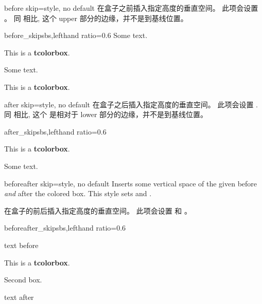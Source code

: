 
\begin{docTcbKey}[][doc new and updated={2020-09-25}{2015-03-16}]{before skip}{=}{style, no default}
在盒子之前插入指定高度的垂直空间。%
此项会设置 。%
同  相比, 这个  upper 部分的边缘，并不是到基线位置。
\begin{exdispExample*}{before_skip}{sbs,lefthand ratio=0.6}
Some text.
\begin{tcolorbox}[before skip=1cm,
colframe=red!50!white]
This is a \textbf{tcolorbox}.
\end{tcolorbox}

Some text.
\begin{tcolorbox}[before skip=0cm,
colframe=red!50!white]
This is a \textbf{tcolorbox}.
\end{tcolorbox}
\end{exdispExample*}
\end{docTcbKey}

\begin{docTcbKey}[][doc new and updated={2020-09-25}{2017-02-01}]{after skip}{=}{style, no default}
在盒子之后插入指定高度的垂直空间。%
此项会设置 .
同  相比, %
这个  是相对于 lower 部分的边缘，并不是到基线位置。%
\begin{exdispExample*}{after_skip}{sbs,lefthand ratio=0.6}
\begin{tcolorbox}[after skip=1cm,
colframe=red!50!white]
This is a \textbf{tcolorbox}.
\end{tcolorbox}
Some text.
\end{exdispExample*}
\end{docTcbKey}

\begin{docTcbKey}[][doc new=2014-10-10]{beforeafter skip}{=}{style, no default}
Inserts some vertical space of the given  before \emph{and} after the colored box.
This style sets  and .

在盒子的前后插入指定高度的垂直空间。%
此项会设置  和 。


\begin{exdispExample*}{beforeafter_skip}{sbs,lefthand ratio=0.6}

text before
\begin{tcolorbox}
This is a \textbf{tcolorbox}.
\end{tcolorbox}
\begin{tcolorbox}
Second box.
\end{tcolorbox}
text after
\end{exdispExample*}
\end{docTcbKey}



